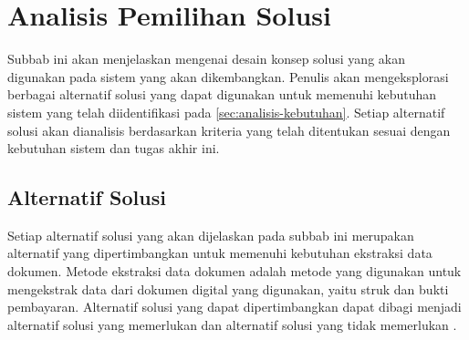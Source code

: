 \section{Analisis Pemilihan Solusi}
\label{sec:analisis-pemilihan-solusi}

Subbab ini akan menjelaskan mengenai desain konsep solusi yang akan digunakan pada sistem yang akan dikembangkan. Penulis akan mengeksplorasi berbagai alternatif solusi yang dapat digunakan untuk memenuhi kebutuhan sistem yang telah diidentifikasi pada \autoref{sec:analisis-kebutuhan}. Setiap alternatif solusi akan dianalisis berdasarkan kriteria yang telah ditentukan sesuai dengan kebutuhan sistem dan tugas akhir ini.

\subsection{Alternatif Solusi}
\label{subsec:alternatif-solusi}
Setiap alternatif solusi yang akan dijelaskan pada subbab ini merupakan alternatif yang dipertimbangkan untuk memenuhi kebutuhan ekstraksi data dokumen. Metode ekstraksi data dokumen adalah metode yang digunakan untuk mengekstrak data dari dokumen digital yang digunakan, yaitu struk dan bukti pembayaran. Alternatif solusi yang dapat dipertimbangkan dapat dibagi menjadi alternatif solusi yang memerlukan \ocr{} dan alternatif solusi yang tidak memerlukan \ocr. 

